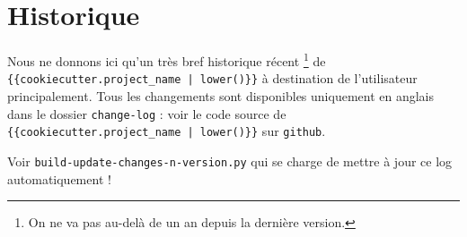 \documentclass[12pt,a4paper]{article}
\begin{document}
\newpage

\section{Historique}

Nous ne donnons ici qu'un très bref historique récent
\footnote{
	On ne va pas au-delà de un an depuis la dernière version.
}
de \verb+{{cookiecutter.project_name | lower()}}+ à destination de l'utilisateur principalement.
Tous les changements sont disponibles uniquement en anglais dans le dossier \verb+change-log+ : voir le code source de \verb+{{cookiecutter.project_name | lower()}}+ sur \verb+github+.

\begin{description}

    \item Voir \verb+build-update-changes-n-version.py+ qui se charge de mettre à jour ce log automatiquement !

\end{description}
\end{document}

